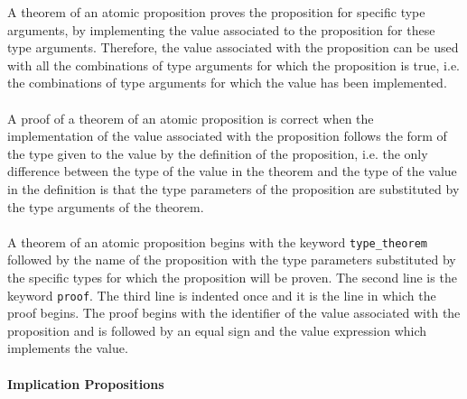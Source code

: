 \documentclass{article}
\begin{document}
\begin{itemize}
A theorem of an atomic proposition proves the proposition for
specific type arguments, by implementing the value associated to the
proposition for these type arguments. Therefore, the value associated with the
proposition can be used with all the combinations of type arguments for which
the proposition is true, i.e. the combinations of type arguments for which
the value has been implemented.
\\\\
A proof of a theorem of an atomic proposition is correct when the
implementation of the value associated with the proposition follows the form of
the type given to the value by the definition of the proposition, i.e. the only
difference between the type of the value in the theorem and the type of the
value in the definition is that the type parameters of the proposition are
substituted by the type arguments of the theorem.
\\\\
A theorem of an atomic proposition begins with the keyword
\texttt{type_theorem} followed by the name of the proposition with the type
parameters substituted by the specific types for which the proposition will be
proven. The second line is the keyword \texttt{proof}. The third line is
indented once and it is the line in which the proof begins. The proof begins
with the identifier of the value associated with the proposition and is
followed by an equal sign and the value expression which implements the value.

\end{itemize}

\newpage

\paragraph{Implication Propositions}
\end{document}
